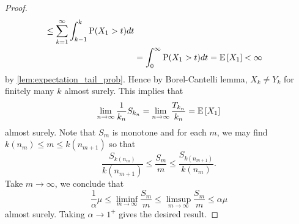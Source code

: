 \begin{proof}
\begin{equation*}
\begin{split}
            \leq \sum_{k=1}^\infty \int_{k-1}^k\operatorname{P}(X_1>t)dt \\
            &= \int_0^\infty \operatorname{P}(X_1>t)dt = \operatorname{E}\left[ {X_1} \right]<\infty
        \end{split}
    \end{equation*}
    by \cref{lem:expectation_tail_prob}. Hence by Borel-Cantelli 
    lemma, $X_k \neq Y_k$ for finitely many $k$ almost surely. 
    This implies that 
    \begin{equation*}
        \lim_{n\to\infty}\frac{1}{k_n}S_{k_n} = \lim_{n\to\infty}\frac{T_{k_n}}{k_n} = \operatorname{E}\left[ {X_1} \right]
    \end{equation*}
    almost surely. Note that $S_m$ is monotone and for each $m$, 
    we may find $k(n_m)\leq m\leq k(n_{m+1})$ so that 
    \begin{equation*}
        \frac{S_{k(n_m)}}{k(n_{m+1})}\leq \frac{S_m}{m} 
        \leq \frac{S_{k(n_{m+1})}}{k(n_m)}.
    \end{equation*} 
    Take $m\to\infty$, we conclude that 
    \begin{equation*}
        \frac{1}{\alpha}\mu \leq \liminf_{m\to\infty}\frac{S_m}{m} 
        \leq \limsup_{m\to\infty}\frac{S_m}{m}\leq \alpha\mu
    \end{equation*}
    almost surely. Taking $\alpha\to 1^+$ gives the desired result. 
\end{proof}